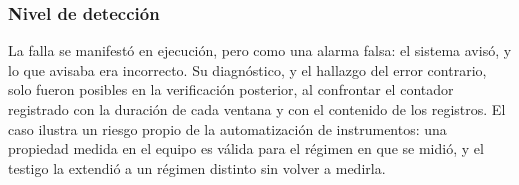 \subsubsection*{Nivel de detección}

La falla se manifestó en ejecución, pero como una alarma falsa: el
sistema avisó, y lo que avisaba era incorrecto. Su diagnóstico, y el
hallazgo del error contrario, solo fueron posibles en la verificación
posterior, al confrontar el contador registrado con la duración de
cada ventana y con el contenido de los registros. El caso ilustra un
riesgo propio de la automatización de instrumentos: una propiedad
medida en el equipo es válida para el régimen en que se midió, y el
testigo la extendió a un régimen distinto sin volver a medirla.
